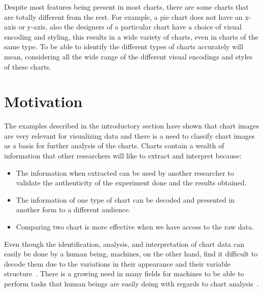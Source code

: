 \documentclass[12pt, a4paper,oneside]{report}
\begin{document}
Despite most features being present in most charts, there are some charts that are totally different from the rest. For example, a pie chart does not have an x-axis or y-axis, also the designers of a particular chart have a choice of visual encoding and styling, this results in a wide variety of charts, even in charts of the same type. To be able to identify the different types of charts accurately will mean, considering all the wide range of the different visual encodings and styles of these charts.

\section{Motivation}
The examples described in the introductory section have shown that chart images are very relevant for visualizing data and there is a need to classify chart images as a basis for further analysis of the charts. Charts contain a wealth of information that other researchers will like to extract and interpret because:
\begin{itemize}
	\item The information when extracted can be used by another researcher to validate the authenticity of the experiment done and the results obtained.
	
	\item The information of one type of chart can be decoded and presented in another form to a different audience.
	
	\item Comparing two chart is more effective when we have access to the raw data.
\end{itemize} 

Even though the identification, analysis, and interpretation of chart data can easily be done by a human being, machines, on the other hand, find it difficult to decode them due to the variations in their appearance and their variable structure~\cite{liu2015chart}. There is a growing need in many fields for machines to be able to perform tasks that human beings are easily doing with regards to chart analysis~\cite{amara2017convolutional}. 
\end{document}
